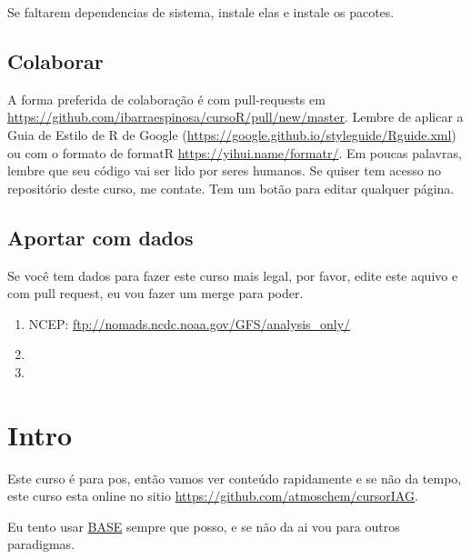 \documentclass[]{book}
\theoremstyle{definition}
\theoremstyle{definition}
\theoremstyle{definition}
\theoremstyle{remark}
\begin{document}
Se faltarem dependencias de sistema, instale elas e instale os pacotes.

\section{Colaborar}\label{colaborar}

A forma preferida de colaboração é com pull-requests em
\url{https://github.com/ibarraespinosa/cursoR/pull/new/master}. Lembre
de aplicar a Guia de Estilo de R de Google
(\url{https://google.github.io/styleguide/Rguide.xml}) ou com o formato
de formatR \url{https://yihui.name/formatr/}. Em poucas palavras, lembre
que seu código vai ser lido por seres humanos. Se quiser tem acesso no
repositório deste curso, me contate. Tem um botão para editar qualquer
página.

\section{Aportar com dados}\label{aportar-com-dados}

Se você tem dados para fazer este curso mais legal, por favor, edite
este aquivo e com pull request, eu vou fazer um merge para poder.

\begin{enumerate}
\def\labelenumi{\arabic{enumi}.}
\item
  NCEP: \url{ftp://nomads.ncdc.noaa.gov/GFS/analysis_only/}
\item
\item
\end{enumerate}

\chapter{Intro}\label{intro}

Este curso é para pos, então vamos ver conteúdo rapidamente e se não da
tempo, este curso esta online no sitio
\url{https://github.com/atmoschem/cursorIAG}.

Eu tento usar
\href{http://stat.ethz.ch/R-manual/R-devel/library/base/html/00Index.html}{BASE}
sempre que posso, e se não da ai vou para outros paradigmas.
\end{document}
